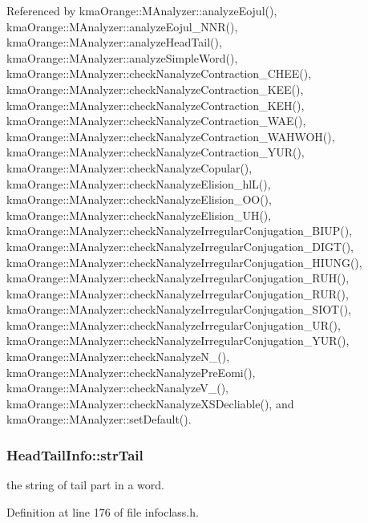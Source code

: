 Referenced by kmaOrange::MAnalyzer::analyzeEojul(), kmaOrange::MAnalyzer::analyzeEojul\_\-NNR(), kmaOrange::MAnalyzer::analyzeHeadTail(), kmaOrange::MAnalyzer::analyzeSimpleWord(), kmaOrange::MAnalyzer::checkNanalyzeContraction\_\-CHEE(), kmaOrange::MAnalyzer::checkNanalyzeContraction\_\-KEE(), kmaOrange::MAnalyzer::checkNanalyzeContraction\_\-KEH(), kmaOrange::MAnalyzer::checkNanalyzeContraction\_\-WAE(), kmaOrange::MAnalyzer::checkNanalyzeContraction\_\-WAHWOH(), kmaOrange::MAnalyzer::checkNanalyzeContraction\_\-YUR(), kmaOrange::MAnalyzer::checkNanalyzeCopular(), kmaOrange::MAnalyzer::checkNanalyzeElision\_\-hlL(), kmaOrange::MAnalyzer::checkNanalyzeElision\_\-OO(), kmaOrange::MAnalyzer::checkNanalyzeElision\_\-UH(), kmaOrange::MAnalyzer::checkNanalyzeIrregularConjugation\_\-BIUP(), kmaOrange::MAnalyzer::checkNanalyzeIrregularConjugation\_\-DIGT(), kmaOrange::MAnalyzer::checkNanalyzeIrregularConjugation\_\-HIUNG(), kmaOrange::MAnalyzer::checkNanalyzeIrregularConjugation\_\-RUH(), kmaOrange::MAnalyzer::checkNanalyzeIrregularConjugation\_\-RUR(), kmaOrange::MAnalyzer::checkNanalyzeIrregularConjugation\_\-SIOT(), kmaOrange::MAnalyzer::checkNanalyzeIrregularConjugation\_\-UR(), kmaOrange::MAnalyzer::checkNanalyzeIrregularConjugation\_\-YUR(), kmaOrange::MAnalyzer::checkNanalyzeN\_\-(), kmaOrange::MAnalyzer::checkNanalyzePreEomi(), kmaOrange::MAnalyzer::checkNanalyzeV\_\-(), kmaOrange::MAnalyzer::checkNanalyzeXSDecliable(), and kmaOrange::MAnalyzer::setDefault().\hypertarget{classHeadTailInfo_ec9d1ca7e23e1b009dfe3600e89c87dd}{
\subsubsection[{strTail}]{ {\bf HeadTailInfo::strTail}}}
\label{classHeadTailInfo_ec9d1ca7e23e1b009dfe3600e89c87dd}


the string of tail part in a word. 



Definition at line 176 of file infoclass.h.


